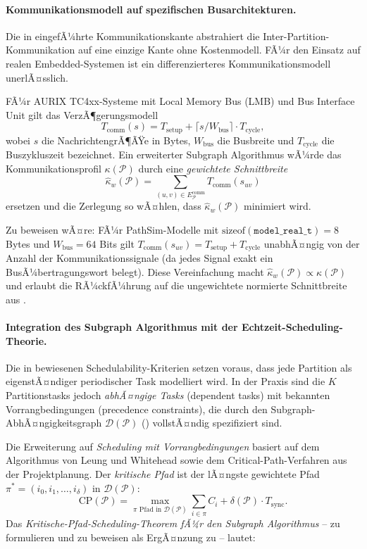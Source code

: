 ﻿\documentclass[12pt,a4paper]{article}
\theoremstyle{definition}
\begin{document}
\paragraph{Kommunikationsmodell auf spezifischen Busarchitekturen.}
Die in  eingefÃ¼hrte Kommunikationskante
abstrahiert die Inter-Partition-Kommunikation auf eine einzige
Kante ohne Kostenmodell. FÃ¼r den Einsatz auf realen
Embedded-Systemen ist ein differenzierteres Kommunikationsmodell
unerlÃ¤sslich.

FÃ¼r AURIX TC4xx-Systeme mit Local Memory Bus (LMB) und
Bus Interface Unit gilt das VerzÃ¶gerungsmodell
\[
  T_{\mathrm{comm}}(s) = T_{\mathrm{setup}} + \lceil s / W_{\mathrm{bus}} \rceil \cdot T_{\mathrm{cycle}},
\]
wobei $s$ die NachrichtengrÃ¶ÃŸe in Bytes, $W_{\mathrm{bus}}$ die
Busbreite und $T_{\mathrm{cycle}}$ die Buszykluszeit bezeichnet.
Ein erweiterter Subgraph Algorithmus wÃ¼rde das
Kommunikationsprofil $\kappa(\mathcal{P})$ durch eine
\emph{gewichtete Schnittbreite}
\[
  \hat{\kappa}_w(\mathcal{P})
  = \sum_{(u,v) \in E_{\mathcal{P}}^{\mathrm{comm}}} T_{\mathrm{comm}}(s_{uv})
\]
ersetzen und die Zerlegung so wÃ¤hlen, dass $\hat{\kappa}_w(\mathcal{P})$
minimiert wird.

Zu beweisen wÃ¤re: FÃ¼r PathSim-Modelle mit
$\mathrm{sizeof}(\texttt{model\_real\_t}) = 8$ Bytes und
$W_{\mathrm{bus}} = 64$ Bits gilt
$T_{\mathrm{comm}}(s_{uv}) = T_{\mathrm{setup}} + T_{\mathrm{cycle}}$
unabhÃ¤ngig von der Anzahl der Kommunikationssignale (da jedes Signal
exakt ein BusÃ¼bertragungswort belegt). Diese Vereinfachung macht
$\hat{\kappa}_w(\mathcal{P}) \propto \kappa(\mathcal{P})$ und
erlaubt die RÃ¼ckfÃ¼hrung auf die ungewichtete normierte Schnittbreite
aus .

\paragraph{Integration des Subgraph Algorithmus mit der Echtzeit-Scheduling-Theorie.}
Die in  bewiesenen
Schedulability-Kriterien setzen voraus, dass jede Partition als
eigenstÃ¤ndiger periodischer Task modelliert wird. In der Praxis
sind die $K$ Partitionstasks jedoch \emph{abhÃ¤ngige Tasks} (dependent
tasks) mit bekannten Vorrangbedingungen (precedence constraints),
die durch den Subgraph-AbhÃ¤ngigkeitsgraph $\mathcal{D}(\mathcal{P})$
() vollstÃ¤ndig spezifiziert sind.

Die Erweiterung auf \emph{Scheduling mit Vorrangbedingungen}
basiert auf dem Algorithmus von Leung und Whitehead \cite{liu1973}
sowie dem Critical-Path-Verfahren aus der Projektplanung.
Der \emph{kritische Pfad} ist der lÃ¤ngste gewichtete Pfad
$\pi^* = (i_0, i_1, \ldots, i_{\delta})$ in $\mathcal{D}(\mathcal{P})$:
\[
  \mathrm{CP}(\mathcal{P})
  = \max_{\pi \text{ Pfad in } \mathcal{D}(\mathcal{P})}
    \sum_{i \in \pi} C_i + \delta(\mathcal{P}) \cdot T_{\mathrm{sync}}.
\]
Das \emph{Kritische-Pfad-Scheduling-Theorem fÃ¼r den Subgraph Algorithmus}
-- zu formulieren und zu beweisen als ErgÃ¤nzung zu
 -- lautet:
\end{document}
